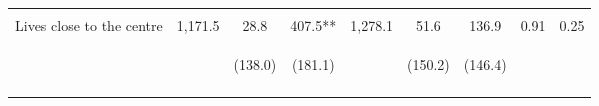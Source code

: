 \begin{tabular}{lcccccccc}
 & \begin{footnotesize}\end{footnotesize} & \begin{footnotesize}[1.000]\end{footnotesize} & \begin{footnotesize}[0.036]\end{footnotesize} & \begin{footnotesize}\end{footnotesize} & \begin{footnotesize}[1.000]\end{footnotesize} & \begin{footnotesize}[0.632]\end{footnotesize} & \begin{footnotesize}\end{footnotesize} & \begin{footnotesize}\end{footnotesize}\\
\noalign{\smallskip}Lives close to the centre & 1,171.5 & 28.8 & 407.5** & 1,278.1 & 51.6 & 136.9 & 0.91 & 0.25\\
 & \begin{footnotesize}\end{footnotesize} & \begin{footnotesize}(138.0)\end{footnotesize} & \begin{footnotesize}(181.1)\end{footnotesize} & \begin{footnotesize}\end{footnotesize} & \begin{footnotesize}(150.2)\end{footnotesize} & \begin{footnotesize}(146.4)\end{footnotesize} & \begin{footnotesize}\end{footnotesize} & \begin{footnotesize}\end{footnotesize}\\
 & \begin{footnotesize}\end{footnotesize} & \begin{footnotesize}[1.000]\end{footnotesize} & \begin{footnotesize}[0.036]\end{footnotesize} & \begin{footnotesize}\end{footnotesize} & \begin{footnotesize}[1.000]\end{footnotesize} & \begin{footnotesize}[0.632]\end{footnotesize} & \begin{footnotesize}\end{footnotesize} & \begin{footnotesize}\end{footnotesize}\\\hline

\end{tabular}
